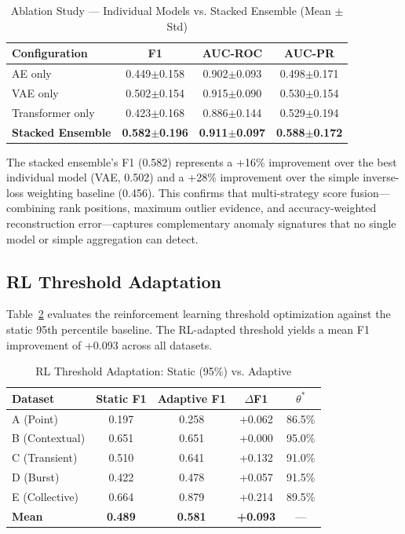 \documentclass[conference]{IEEEtran}
\begin{document}
\begin{table}[htbp]
\caption{Ablation Study --- Individual Models vs. Stacked Ensemble (Mean $\pm$ Std)}
\begin{center}
\begin{tabular}{|l|c|c|c|}
\hline
\textbf{Configuration} & \textbf{F1} & \textbf{AUC-ROC} & \textbf{AUC-PR} \\
\hline
AE only & 0.449$\pm$0.158 & 0.902$\pm$0.093 & 0.498$\pm$0.171 \\
VAE only & 0.502$\pm$0.154 & 0.915$\pm$0.090 & 0.530$\pm$0.154 \\
Transformer only & 0.423$\pm$0.168 & 0.886$\pm$0.144 & 0.529$\pm$0.194 \\
\textbf{Stacked Ensemble} & \textbf{0.582$\pm$0.196} & \textbf{0.911$\pm$0.097} & \textbf{0.588$\pm$0.172} \\
\hline
\end{tabular}
\label{tab:ablation}
\end{center}
\end{table}

The stacked ensemble's F1 (0.582) represents a +16\% improvement over the best individual model (VAE, 0.502) and a +28\% improvement over the simple inverse-loss weighting baseline (0.456). This confirms that multi-strategy score fusion---combining rank positions, maximum outlier evidence, and accuracy-weighted reconstruction error---captures complementary anomaly signatures that no single model or simple aggregation can detect.

\subsection{RL Threshold Adaptation}

Table~\ref{tab:rl_threshold} evaluates the reinforcement learning threshold optimization against the static 95th percentile baseline. The RL-adapted threshold yields a mean F1 improvement of +0.093 across all datasets.

\begin{table}[htbp]
\caption{RL Threshold Adaptation: Static (95\%) vs. Adaptive}
\begin{center}
\begin{tabular}{|l|c|c|c|c|}
\hline
\textbf{Dataset} & \textbf{Static F1} & \textbf{Adaptive F1} & \textbf{$\Delta$F1} & \textbf{$\theta^*$} \\
\hline
A (Point) & 0.197 & 0.258 & +0.062 & 86.5\% \\
B (Contextual) & 0.651 & 0.651 & +0.000 & 95.0\% \\
C (Transient) & 0.510 & 0.641 & +0.132 & 91.0\% \\
D (Burst) & 0.422 & 0.478 & +0.057 & 91.5\% \\
E (Collective) & 0.664 & 0.879 & +0.214 & 89.5\% \\
\hline
\textbf{Mean} & \textbf{0.489} & \textbf{0.581} & \textbf{+0.093} & --- \\
\hline
\end{tabular}
\label{tab:rl_threshold}
\end{center}
\end{table}
\end{document}

